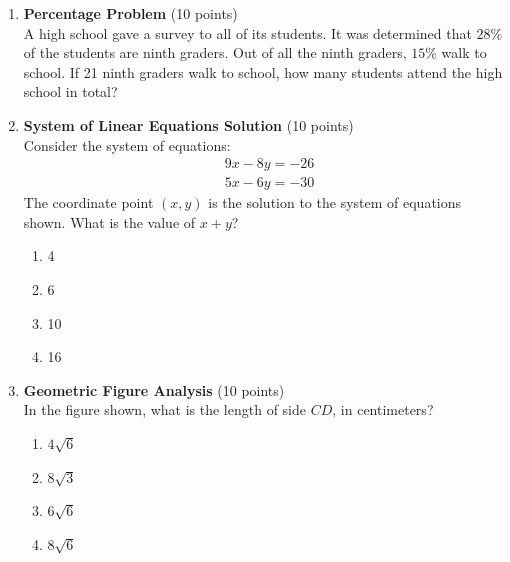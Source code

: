 \begin{enumerate}
  \item \textbf{Percentage Problem} (10 points)\\
  A high school gave a survey to all of its students. It was determined that $28\%$ of the students are ninth graders. Out of all the ninth graders, $15\%$ walk to school. If 21 ninth graders walk to school, how many students attend the high school in total?
  \begin{subanswer}
  \end{subanswer}


  \newpage

  \item \textbf{System of Linear Equations Solution} (10 points)\\
  Consider the system of equations:
  \[
    \begin{aligned}
    & 9 x-8 y=-26 \\
    & 5 x-6 y=-30
    \end{aligned}
  \]
  The coordinate point $(x, y)$ is the solution to the system of equations shown. What is the value of $x+y$?
  \begin{enumerate}[label=(\Alph*)]
    \item 4
    \item 6
    \item 10
    \item 16
  \end{enumerate}
  \begin{subanswer}
  \end{subanswer}

  \item \textbf{Geometric Figure Analysis} (10 points)\\
  In the figure shown, what is the length of side $CD$, in centimeters?
  \begin{enumerate}[label=(\Alph*)]
    \item $4 \sqrt{6}$
    \item $8 \sqrt{3}$
    \item $6 \sqrt{6}$
    \item $8 \sqrt{6}$
  \end{enumerate}
  \begin{subanswer}
  \end{subanswer}



  \newpage


\end{enumerate}
